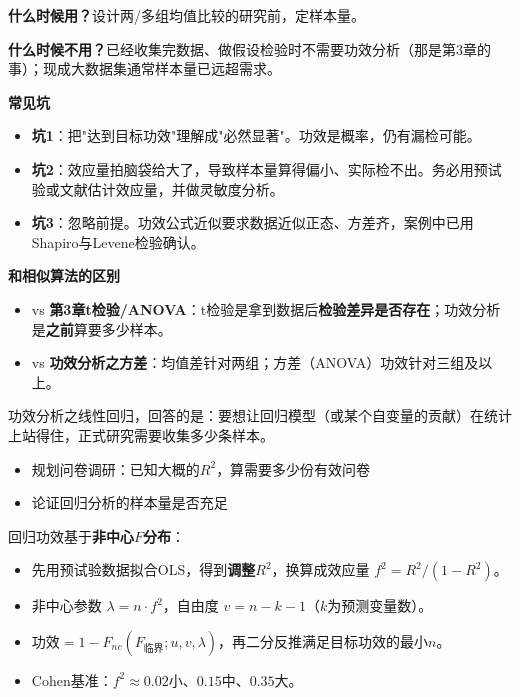 \begin{algonotes}
\textbf{什么时候用？}设计两/多组均值比较的研究前，定样本量。

\textbf{什么时候不用？}已经收集完数据、做假设检验时不需要功效分析（那是第3章的事）；现成大数据集通常样本量已远超需求。

\textbf{常见坑}
\begin{itemize}
    \item \textbf{坑1}：把"达到目标功效"理解成"必然显著"。功效是概率，仍有漏检可能。
    \item \textbf{坑2}：效应量拍脑袋给大了，导致样本量算得偏小、实际检不出。务必用预试验或文献估计效应量，并做灵敏度分析。
    \item \textbf{坑3}：忽略前提。功效公式近似要求数据近似正态、方差齐，案例中已用Shapiro与Levene检验确认。
\end{itemize}

\textbf{和相似算法的区别}
\begin{itemize}
    \item vs \textbf{第3章t检验/ANOVA}：t检验是拿到数据后\textbf{检验差异是否存在}；功效分析是\textbf{之前}算要多少样本。
    \item vs \textbf{功效分析之方差}：均值差针对两组；方差（ANOVA）功效针对三组及以上。
\end{itemize}
\end{algonotes}


\begin{algointro}
功效分析之线性回归，回答的是：要想让回归模型（或某个自变量的贡献）在统计上站得住，正式研究需要收集多少条样本。
\end{algointro}

\begin{algoscene}
\begin{itemize}
    \item 规划问卷调研：已知大概的$R^2$，算需要多少份有效问卷
    \item 论证回归分析的样本量是否充足
\end{itemize}
\end{algoscene}

\begin{algoprinciple}
回归功效基于\textbf{非中心$F$分布}：

\begin{itemize}
    \item 先用预试验数据拟合OLS，得到\textbf{调整$R^2$}，换算成效应量 $f^2 = R^2/(1-R^2)$。
    \item 非中心参数 $\lambda = n\cdot f^2$，自由度 $v = n-k-1$（$k$为预测变量数）。
    \item 功效$=1-F_{nc}(F_{\text{临界}}; u, v, \lambda)$，再二分反推满足目标功效的最小$n$。
    \item Cohen基准：$f^2\approx0.02$小、$0.15$中、$0.35$大。
\end{itemize}
\end{algoprinciple}


